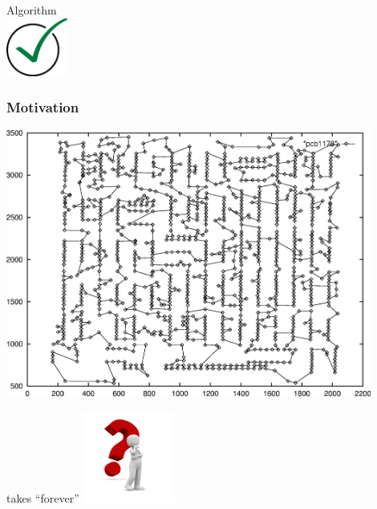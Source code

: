 \documentclass[aspectratio=1610]{beamer}
\begin{document}
\begin{frame}
\begin{minipage}{0.45\textwidth}
\begin{center}
			\bigskip
			Algorithm \\
			\includegraphics[width=2cm]{graphics/hook.png}
		\end{center}
	\end{minipage}
	\qquad
	\frametitle{Motivation}
	\begin{minipage}{0.45\textwidth}
		\begin{center}
			\includegraphics[width=0.9\textwidth]{graphics/TSPLeiter2opt.jpg}

			\bigskip
			 \alert{takes ``forever''}
			\includegraphics[width=3cm]{graphics/question-mark.jpg}
		\end{center}
	\end{minipage}

\end{frame}
\end{document}
